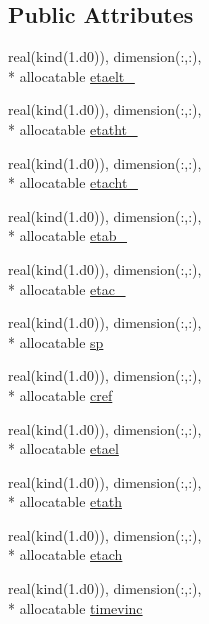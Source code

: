 \subsection*{Public Attributes}
\begin{DoxyCompactItemize}
\item 
real(kind(1.d0)), dimension(\-:,\-:), \\*
allocatable \hyperlink{classplantvar_a1411b8ad84d3bd06274ccdd65f678303}{etaelt\-\_\-}
\item 
real(kind(1.d0)), dimension(\-:,\-:), \\*
allocatable \hyperlink{classplantvar_a96d49c1ab61a68186579469ada973e8d}{etatht\-\_\-}
\item 
real(kind(1.d0)), dimension(\-:,\-:), \\*
allocatable \hyperlink{classplantvar_a0bcd182c0cec3e561b2fe88b6c65550a}{etacht\-\_\-}
\item 
real(kind(1.d0)), dimension(\-:,\-:), \\*
allocatable \hyperlink{classplantvar_a1a598548c66afe280ab1e9b3bc0d108c}{etab\-\_\-}
\item 
real(kind(1.d0)), dimension(\-:,\-:), \\*
allocatable \hyperlink{classplantvar_a43d9f2b69d22ee7dea582ef47917a222}{etac\-\_\-}
\item 
real(kind(1.d0)), dimension(\-:,\-:), \\*
allocatable \hyperlink{classplantvar_a9ce23c96a4155736d33f064180fabeb8}{sp}
\item 
real(kind(1.d0)), dimension(\-:,\-:), \\*
allocatable \hyperlink{classplantvar_acb2e8b2b10b5bac29d24d2eb880431cd}{cref}
\item 
real(kind(1.d0)), dimension(\-:,\-:), \\*
allocatable \hyperlink{classplantvar_a147383d8988f7f269a7a8ef91e174332}{etael}
\item 
real(kind(1.d0)), dimension(\-:,\-:), \\*
allocatable \hyperlink{classplantvar_af7b5f83a54b793676f6b4838a1b50957}{etath}
\item 
real(kind(1.d0)), dimension(\-:,\-:), \\*
allocatable \hyperlink{classplantvar_a6a8479fe7ccd064d132fe1a76632c7a4}{etach}
\item 
real(kind(1.d0)), dimension(\-:,\-:), \\*
allocatable \hyperlink{classplantvar_a6dea565d53d4827373d4f85f19b2926e}{timevinc}
\item 

\end{DoxyCompactItemize}
